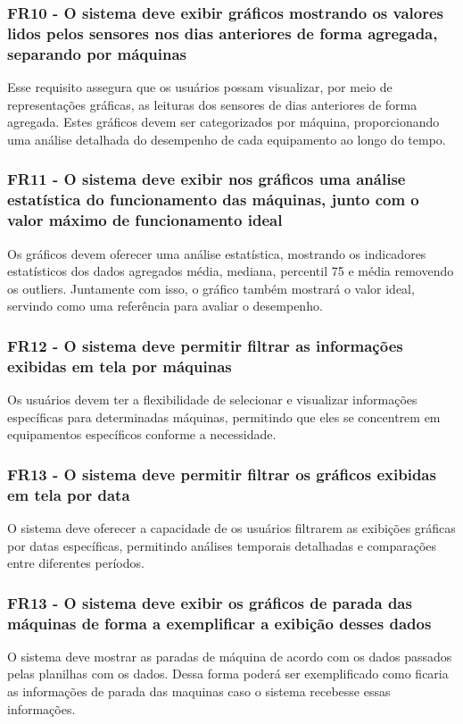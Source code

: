 \subsubsection{FR10 - O sistema deve exibir gráficos mostrando os valores lidos pelos sensores nos dias anteriores de forma agregada, separando por máquinas}
Esse requisito assegura que os usuários possam visualizar, por meio de representações gráficas, as leituras dos sensores de dias anteriores de forma agregada. Estes gráficos devem ser categorizados por máquina, proporcionando uma análise detalhada do desempenho de cada equipamento ao longo do tempo.

\subsubsection{FR11 - O sistema deve exibir nos gráficos uma análise estatística do funcionamento das máquinas, junto com o valor máximo de funcionamento ideal}
Os gráficos devem oferecer uma análise estatística, mostrando os indicadores estatísticos dos dados agregados média, mediana, percentil 75 e média removendo os outliers. Juntamente com isso, o gráfico também mostrará o valor ideal, servindo como uma referência para avaliar o desempenho.

\subsubsection{FR12 - O sistema deve permitir filtrar as informações exibidas em tela por máquinas}
Os usuários devem ter a flexibilidade de selecionar e visualizar informações específicas para determinadas máquinas, permitindo que eles se concentrem em equipamentos específicos conforme a necessidade.

\subsubsection{FR13 - O sistema deve permitir filtrar os gráficos exibidas em tela por data}
O sistema deve oferecer a capacidade de os usuários filtrarem as exibições gráficas por datas específicas, permitindo análises temporais detalhadas e comparações entre diferentes períodos.

\subsubsection{FR13 - O sistema deve exibir os gráficos de parada das máquinas de forma a exemplificar a exibição desses dados}
O sistema deve mostrar as paradas de máquina de acordo com os dados passados pelas planilhas com os dados. Dessa forma poderá ser exemplificado como ficaria as informações de parada das maquinas caso o sistema recebesse essas informações.


